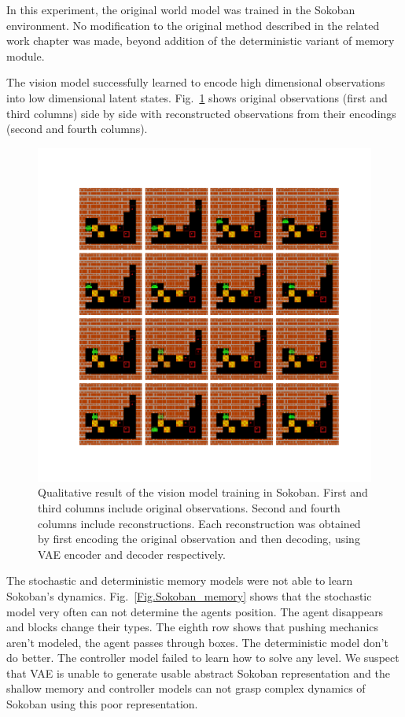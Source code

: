 In this experiment, the original world model was trained in the Sokoban environment. No modification to the original method described in the related work chapter was made, beyond addition of the deterministic variant of memory module.

The vision model successfully learned to encode high dimensional observations into low dimensional latent states. Fig.~\ref{Fig.Sokoban_vision} shows original observations (first and third columns) side by side with reconstructed observations from their encodings (second and fourth columns).

\begin{figure}[H]
\includegraphics[width=1\textwidth,keepaspectratio]{figures/Sokoban_vision.png}
\caption[Qualitative result of the vision model training in Sokoban]{Qualitative result of the vision model training in Sokoban. First and third columns include original observations. Second and fourth columns include reconstructions. Each reconstruction was obtained by first encoding the original observation and then decoding, using VAE encoder and decoder respectively.}
\label{Fig.Sokoban_vision}
\end{figure}

The stochastic and deterministic memory models were not able to learn Sokoban’s dynamics. Fig.~\ref{Fig.Sokoban_memory} shows that the stochastic model very often can not determine the agents position. The agent disappears and blocks change their types. The eighth row shows that pushing mechanics aren't modeled, the agent passes through boxes. The deterministic model don't do better.
The controller model failed to learn how to solve any level. We suspect that VAE is unable to generate usable abstract Sokoban representation and the shallow memory and controller models can not grasp complex dynamics of Sokoban using this poor representation.


